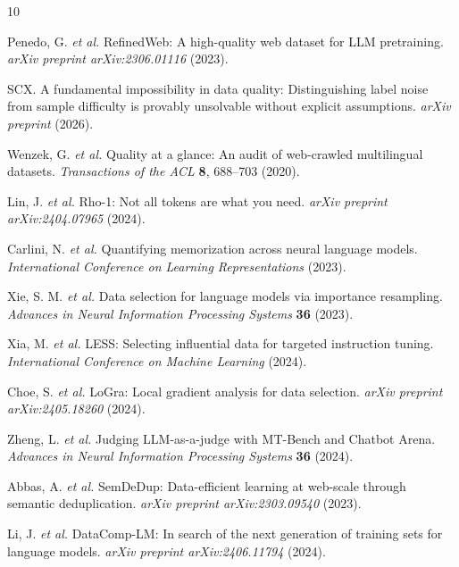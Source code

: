 \documentclass[11pt]{article}
\begin{document}
\begin{thebibliography}{10}

Penedo, G. \textit{et al.} RefinedWeb: A high-quality web dataset for LLM pretraining. \textit{arXiv preprint arXiv:2306.01116} (2023).

SCX. A fundamental impossibility in data quality: Distinguishing label noise from sample difficulty is provably unsolvable without explicit assumptions. \textit{arXiv preprint} (2026).

Wenzek, G. \textit{et al.} Quality at a glance: An audit of web-crawled multilingual datasets. \textit{Transactions of the ACL} \textbf{8}, 688--703 (2020).

Lin, J. \textit{et al.} Rho-1: Not all tokens are what you need. \textit{arXiv preprint arXiv:2404.07965} (2024).

Carlini, N. \textit{et al.} Quantifying memorization across neural language models. \textit{International Conference on Learning Representations} (2023).

Xie, S. M. \textit{et al.} Data selection for language models via importance resampling. \textit{Advances in Neural Information Processing Systems} \textbf{36} (2023).

Xia, M. \textit{et al.} LESS: Selecting influential data for targeted instruction tuning. \textit{International Conference on Machine Learning} (2024).

Choe, S. \textit{et al.} LoGra: Local gradient analysis for data selection. \textit{arXiv preprint arXiv:2405.18260} (2024).

Zheng, L. \textit{et al.} Judging LLM-as-a-judge with MT-Bench and Chatbot Arena. \textit{Advances in Neural Information Processing Systems} \textbf{36} (2024).

Abbas, A. \textit{et al.} SemDeDup: Data-efficient learning at web-scale through semantic deduplication. \textit{arXiv preprint arXiv:2303.09540} (2023).

Li, J. \textit{et al.} DataComp-LM: In search of the next generation of training sets for language models. \textit{arXiv preprint arXiv:2406.11794} (2024).

\end{thebibliography}
\end{document}
